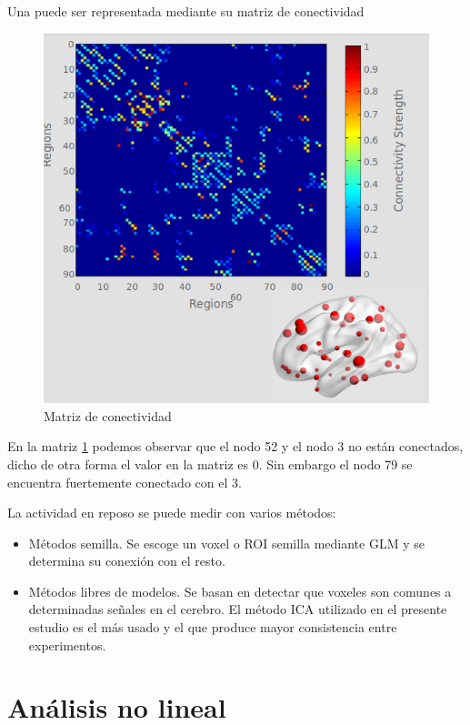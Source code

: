 Una puede ser representada mediante su matriz de conectividad

	\begin{figure}[H]
  		\centering
    	\includegraphics[scale=0.5]{img/matrix_conect.png}
  		\caption{Matriz de conectividad}         \label{preproc:matrix_conect}
	\end{figure}
	
En la matriz \ref{preproc:matrix_conect} podemos observar que el nodo 52 y el nodo 3 no están conectados, dicho de otra forma el valor en la matriz es 0. Sin embargo el nodo 79 se encuentra fuertemente conectado con el 3.

La actividad en reposo se puede medir con varios métodos:

\begin{itemize}
	\item Métodos semilla. Se escoge un voxel o ROI semilla mediante GLM y se determina su conexión con el resto.
	\item Métodos libres de modelos. Se basan en detectar que voxeles son comunes a determinadas señales en el cerebro. El método ICA utilizado en el presente estudio es el más usado y el que produce mayor consistencia entre experimentos.
\end{itemize}

\section{Análisis no lineal}

